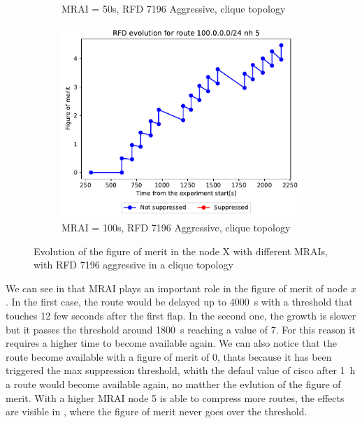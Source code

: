\begin{figure}[h]
\begin{subfigure}[b]{0.3\textwidth}
         \caption{MRAI = 50s, RFD 7196 Aggressive, clique topology}
         \label{fig:clique_x_mrai50_rfd7196Aggressive}
     \end{subfigure}
     \hfill
     \begin{subfigure}[b]{0.3\textwidth}
         \centering
         \includegraphics[width=\textwidth]{images/RFD/clique/FigureOfMerit/mrai21_RFD_7196_aggressive_x_rfd_R1.pdf}
         \caption{MRAI = 100s, RFD 7196 Aggressive, clique topology}
         \label{fig:clique_x_mrai100_rfd7196Aggressive}
     \end{subfigure}
        \caption{Evolution of the figure of merit in the node X with different MRAIs, with RFD 7196 aggressive in a clique topology}
        \label{fig:clique_nodex_rfd7196Aggressive}
\end{figure}

We can see in 
that \ac{MRAI} plays an important role in the figure of merit of node $x$.
In the first case, the route would be delayed up to \SI{4000}{\second} with a 
threshold that touches \num{12} few seconds after the first flap.
In the second one, the growth is slower but it passes the threshold around
\SI{1800}{\second} reaching a value of \num{7}.
For this reason it requires a higher time to become available again.
We can also notice that the route become available with a figure of merit of 
\num{0}, thats because it has been triggered the max suppression threshold, 
whith the defaul value of cisco after \SI{1}{\hour} a route would become available
again, no matther the evlution of the figure of merit.
With a higher \ac{MRAI} node \num{5} is able to compress more routes, the effects
are visible in , where the figure of
merit never goes over the threshold.
 
